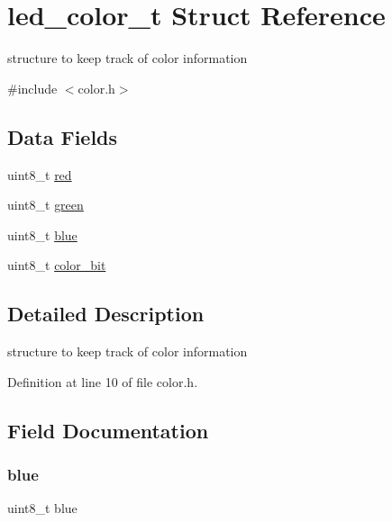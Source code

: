 \hypertarget{structled__color__t}{}\section{led\+\_\+color\+\_\+t Struct Reference}
\label{structled__color__t}


structure to keep track of color information  




{\ttfamily \#include $<$color.\+h$>$}

\subsection*{Data Fields}
\begin{DoxyCompactItemize}
\item 
uint8\+\_\+t \hyperlink{structled__color__t_ad47d918910aaa51c73160ac85999d09c}{red}
\item 
uint8\+\_\+t \hyperlink{structled__color__t_a90d21fa503b626c00cdc8d94863d5877}{green}
\item 
uint8\+\_\+t \hyperlink{structled__color__t_a287b397e90d7b995c81ff54e741f96b2}{blue}
\item 
uint8\+\_\+t \hyperlink{structled__color__t_a20303e3baf7a44885164f4a273c8b23d}{color\+\_\+bit}
\end{DoxyCompactItemize}


\subsection{Detailed Description}
structure to keep track of color information 

Definition at line 10 of file color.\+h.



\subsection{Field Documentation}
\hypertarget{structled__color__t_a287b397e90d7b995c81ff54e741f96b2}{}\label{structled__color__t_a287b397e90d7b995c81ff54e741f96b2} 
\subsubsection{\texorpdfstring{blue}{blue}}
{\footnotesize\ttfamily uint8\+\_\+t blue}

